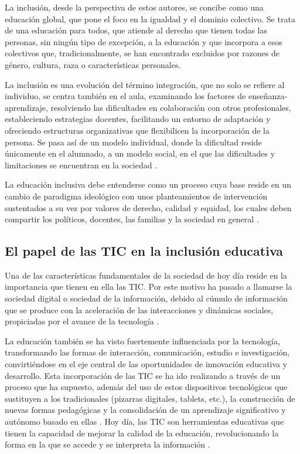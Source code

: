 \documentclass[spanish]{textolivre}
\begin{document}
La inclusión, desde la perspectiva de estos autores, se concibe como una educación global, que pone el foco en la igualdad y el dominio colectivo. Se trata de  una educación para todos, que atiende al derecho que tienen todas las personas, sin ningún tipo de excepción, a la educación y que incorpora a esos colectivos que, tradicionalmente, se han encontrado excluidos por razones de género, cultura, raza o características personales.

La inclusión es una evolución del término integración, que no solo se refiere al individuo, se centra también en el aula, examinando los factores de enseñanza-aprendizaje, resolviendo las dificultades en colaboración con otros profesionales, estableciendo estrategias docentes, facilitando un entorno de adaptación y ofreciendo estructuras organizativas que flexibilicen la incorporación de la persona. Se pasa así de un modelo individual, donde la dificultad reside únicamente en el alumnado, a un modelo social, en el que las dificultades y limitaciones se encuentran en la sociedad \cite{gallegoortega2016}.

La educación inclusiva debe entenderse como un proceso cuya base reside en un cambio de paradigma ideológico con unos planteamientos de intervención sustentados a su vez por valores de derecho, calidad y equidad, los cuales deben compartir los políticos, docentes, las familias y la sociedad en general \cite{muntaner2019}.

\subsection{El papel de las TIC en la inclusión educativa}
Una de las características fundamentales de la sociedad de hoy día reside en la importancia que tienen en ella las TIC. Por este motivo ha pasado a llamarse la sociedad digital o sociedad de la información, debido al cúmulo de información que se produce con la aceleración de las interacciones y dinámicas sociales, propiciadas por el avance de  la tecnología \cite{hernandez2017, cabero-almenara2019}.

La educación también se ha visto fuertemente influenciada por la tecnología, transformando las formas de interacción, comunicación, estudio e investigación, convirtiéndose en el eje central de las oportunidades de innovación educativa y desarrollo. Esta incorporación de las TIC se ha ido realizando a través de un proceso que ha supuesto, además del uso de estos dispositivos tecnológicos que sustituyen a los tradicionales (pizarras digitales, tablets, etc.), la construcción de nuevas formas pedagógicas y la consolidación de un aprendizaje significativo y autónomo basado en ellas \cite{caceresreche2020}. Hoy día, las TIC son herramientas educativas que tienen la capacidad de mejorar la calidad de la educación, revolucionando la forma en la que se accede y se interpreta la información \cite{morenoguerrero2020}.
\end{document}
